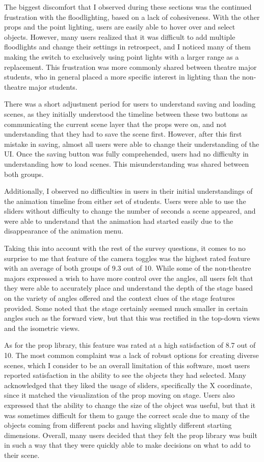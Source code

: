 \documentclass[10pt,twocolumn]{article}
\begin{document}
The biggest discomfort that I observed during these sections was the continued frustration with the floodlighting, based on a lack of cohesiveness. With the other props and the point lighting, users are easily able to hover over and select objects. However, many users realized that it was difficult to add multiple floodlights and change their settings in retrospect, and I noticed many of them making the switch to exclusively using point lights with a larger range as a replacement. This frustration was more commonly shared between theatre major students, who in general placed a more specific interest in lighting than the non-theatre major students. 

There was a short adjustment period for users to understand saving and loading scenes, as they initially understood the timeline between these two buttons as communicating the current scene layer that the props were on, and not understanding that they had to save the scene first. However, after this first mistake in saving, almost all users were able to change their understanding of the UI. Once the saving button was fully comprehended, users had no difficulty in understanding how to load scenes. This misunderstanding was shared between both groups. 

Additionally, I observed no difficulties in users in their initial understandings of the animation timeline from either set of students. Users were able to use the sliders without difficulty to change the number of seconds a scene appeared, and were able to understand that the animation had started easily due to the disappearance of the animation menu. 

Taking this into account with the rest of the survey questions, it comes to no surprise to me that feature of the camera toggles was the highest rated feature with an average of both groups of 9.3 out of 10. While some of the non-theatre majors expressed a wish to have more control over the angles, all users felt that they were able to accurately place and understand the depth of the stage based on the variety of angles offered and the context clues of the stage features provided. Some noted that the stage certainly seemed much smaller in certain angles such as the forward view, but that this was rectified in the top-down views and the isometric views. 

As for the prop library, this feature was rated at a high satisfaction of 8.7 out of 10. The most common complaint was a lack of robust options for creating diverse scenes, which I consider to be an overall limitation of this software, most users reported satisfaction in the ability to see the objects they had selected. Many acknowledged that they liked the usage of sliders, specifically the X coordinate, since it matched the visualization of the prop moving on stage. Users also expressed that the ability to change the size of the object was useful, but that it was sometimes difficult for them to gauge the correct scale due to many of the objects coming from different packs and having slightly different starting dimensions. Overall, many users decided that they felt the prop library was built in such a way that they were quickly able to make decisions on what to add to their scene. 
\end{document}
